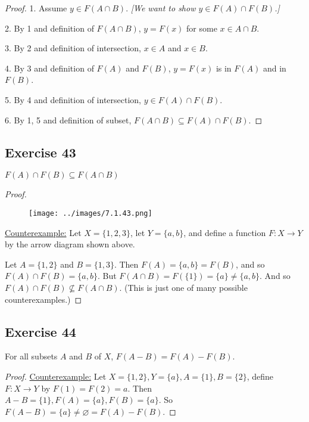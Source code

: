 \documentclass[14pt]{extarticle}
\newcommand{\es}{\varnothing}
\begin{document}
\begin{proof}
    1. Assume \(y \in F(A \cap B)\). {\it [We want to show \(y \in F(A) \cap F(B)\).]}

    2. By 1 and definition of \(F(A \cap B)\), \(y = F(x)\) for some \(x \in A \cap B\).

    3. By 2 and definition of intersection, \(x \in A\) and \(x \in B\).

    4. By 3 and definition of $F(A)$ and $F(B)$, \(y = F(x)\) is in $F(A)$ and in $F(B)$.

    5. By 4 and definition of intersection, \(y \in F(A) \cap F(B)\).

    6. By 1, 5 and definition of subset, \(F(A \cap B) \subseteq F(A) \cap F(B)\).
\end{proof}

\subsection{Exercise 43}
\(F(A) \cap F(B) \subseteq F(A \cap B)\)

\begin{proof}
    \begin{figure}[ht!]
        \centering
        \texttt{[image: ../images/7.1.43.png]}
    \end{figure}
    \underline{Counterexample:} Let \(X = \{1, 2, 3\}\), let \(Y = \{a, b\}\), and define a function \(F: X \to Y\)
    by the arrow diagram shown above.

    Let \(A = \{1, 2\}\) and \(B = \{1, 3\}\). Then \(F(A) = \{a, b\} = F(B)\), and so \(F(A) \cap F(B) = \{a, b\}\). But
    \(F(A \cap B) = F(\{1\}) = \{a\} \neq \{a, b\}\). And so \(F(A) \cap F(B) \nsubseteq F(A \cap B)\). (This is just one
    of many possible counterexamples.)
\end{proof}

\subsection{Exercise 44}
For all subsets $A$ and $B$ of $X$, \(F(A - B) = F(A) - F(B)\).

\begin{proof}
    \underline{Counterexample:} Let \(X = \{1, 2\}, Y = \{a\}, A = \{1\}, B = \{2\}\), define \(F: X \to Y\) by
    \(F(1) = F(2) = a\). Then \(A - B = \{1\}, F(A) = \{a\}, F(B)=\{a\}\). So \(F(A-B) = \{a\} \neq \es = F(A) - F(B)\).
\end{proof}
\end{document}

